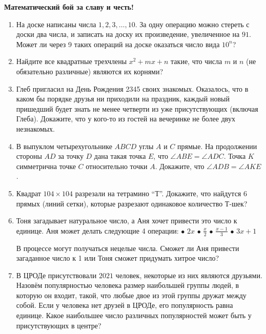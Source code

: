\documentclass{article}
\begin{document}
    \large


    \begin{center}
        \textbf{Математический бой за славу и честь!}
    \end{center}

    \begin{enumerate}[label*=\arabic{enumi}.]

        \item На доске написаны числа $1, 2, 3, \dotso, 10$.
        За одну операцию можно стереть с доски два числа, и записать на доску их произведение, увеличенное на $91$.
        Может ли через 9 таких операций на доске оказаться число вида $10^n$?

        \item Найдите все квадратные трехчлены $x^2 + mx + n$ такие, что числа $m$ и $n$ (не обязательно различные) являются их корнями?

        \item Глеб пригласил на День Рождения 2345 своих знакомых.
        Оказалось, что в каком бы порядке друзья ни приходили на праздник, каждый новый пришедший будет знать не менее четверти из уже присутствующих (включая Глеба).
        Докажите, что у кого-то из гостей на вечеринке не более двух незнакомых.

        \item В выпуклом четырехугольнике $ABCD$ углы $A$ и $C$ прямые.
        На продолжении стороны $AD$ за точку $D$ дана такая точка $E$, что $\angle ABE = \angle ADC$.
        Точка $K$ симметрична точке $C$ относительно точки $A$.
        Докажите, что $\angle ADB = \angle AKE$.

        \item Квадрат $104 \times 104$ разрезали на тетрамино “Т”.
        Докажите, что найдутся 6 прямых (линий сетки), которые разрезают одинаковое количество Т-шек?

        \item Тоня загадывает натуральное число, а Аня хочет привести это число к единице.
        Аня может делать следующие 4 операции: $\bullet$ $2x$ $\bullet$ $ \frac{x}{2}$ $\bullet$ $\frac{x-1}{3}$ $\bullet$ $3x+1$

        В процессе могут получаться нецелые числа.
        Сможет ли Аня привести загаданное число к 1 или Тоня сможет придумать хитрое число?

        \item В ЦРОДе присутствовали $2021$ человек, некоторые из них являются друзьями.
        Назовём популярностью человека размер наибольшей группы людей, в которую он входит, такой, что любые двое из этой группы дружат между собой.
        Если у человека нет друзей в ЦРОДе, его популярность равна единице.
        Какое наибольшее число различных популярностей может быть у присутствующих в центре?


\end{enumerate}
\end{document}
